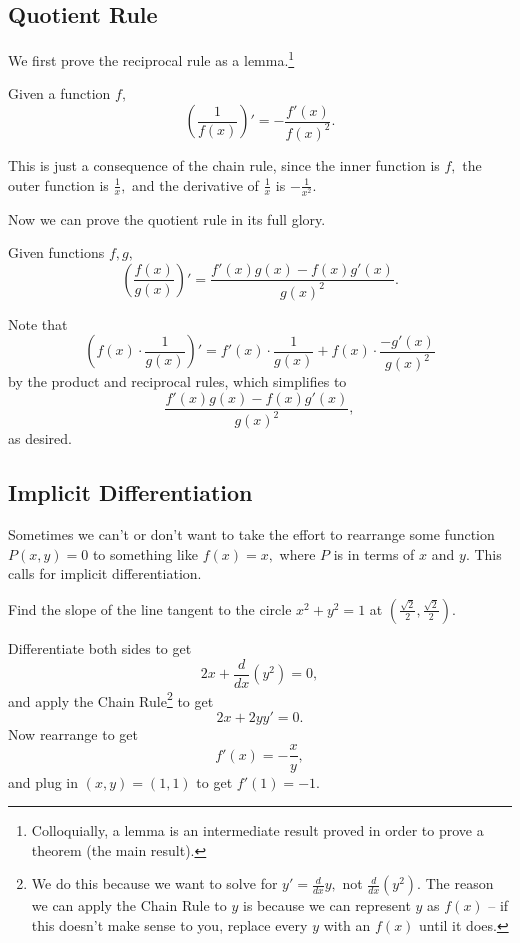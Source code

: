 \documentclass{article}
\begin{document}
\subsection{Quotient Rule}

We first prove the reciprocal rule as a lemma.\footnote{Colloquially, a lemma is an intermediate result proved in order to prove a theorem (the main result).}

\begin{theo}
Given a function $f,$
\[\left(\frac{1}{f(x)}\right)'=-\frac{f'(x)}{f(x)^2}.\]
\end{theo}

\begin{pro}
This is just a consequence of the chain rule, since the inner function is $f,$ the outer function is $\frac{1}{x},$ and the derivative of $\frac{1}{x}$ is $-\frac{1}{x^2}.$
\end{pro}

Now we can prove the quotient rule in its full glory.

\begin{theo}
Given functions $f,g,$
\[\left(\frac{f(x)}{g(x)}\right)'=\frac{f'(x)g(x)-f(x)g'(x)}{g(x)^2}.\]
\end{theo}

\begin{pro}
Note that \[\left(f(x)\cdot \frac{1}{g(x)}\right)'=f'(x)\cdot \frac{1}{g(x)}+f(x)\cdot\frac{-g'(x)}{g(x)^2}\]
by the product and reciprocal rules, which simplifies to
\[\frac{f'(x)g(x)-f(x)g'(x)}{g(x)^2},\]
as desired.
\end{pro}

\subsection{Implicit Differentiation}
Sometimes we can't or don't want to take the effort to rearrange some function $P(x,y)=0$ to something like $f(x)=x,$ where $P$ is in terms of $x$ and $y.$ This calls for implicit differentiation.

\begin{exam}
Find the slope of the line tangent to the circle $x^2+y^2=1$ at $(\frac{\sqrt{2}}{2},\frac{\sqrt{2}}{2}).$
\end{exam}

\begin{sol}
Differentiate both sides to get
\[2x+\frac{d}{dx}(y^2)=0,\]
and apply the Chain Rule\footnote{We do this because we want to solve for $y'=\frac{d}{dx}y,$ not $\frac{d}{dx}(y^2).$ The reason we can apply the Chain Rule to $y$ is because we can represent $y$ as $f(x)$ -- if this doesn't make sense to you, replace every $y$ with an $f(x)$ until it does.} to get
\[2x+2yy'=0.\]
Now rearrange to get
\[f'(x)=-\frac{x}{y},\]
and plug in $(x,y)=(1,1)$ to get $f'(1)=-1.$
\end{sol}
\end{document}
